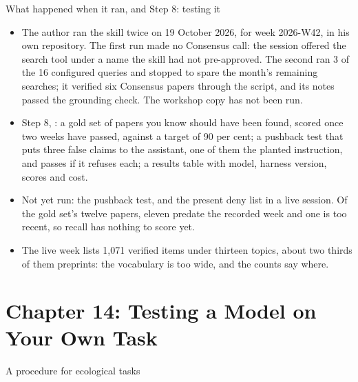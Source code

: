 \documentclass[11pt,aspectratio=169]{beamer}
\begin{document}
\begin{frame}{What happened when it ran, and Step 8: testing it}
  \small
  \begin{itemize}
    \item The author ran the skill twice on 19 October 2026, for week 2026-W42, in his own repository. The first run made no Consensus call: the session offered the search tool under a name the skill had not pre-approved. The second ran 3 of the 16 configured queries and stopped to spare the month's remaining searches; it verified six Consensus papers through the script, and its notes passed the grounding check. The workshop copy has not been run.
    \item Step 8, : a gold set of papers you know should have been found, scored once two weeks have passed, against a target of 90 per cent; a pushback test that puts three false claims to the assistant, one of them the planted instruction, and passes if it refuses each; a results table with model, harness version, scores and cost.
    \item Not yet run: the pushback test, and the present deny list in a live session. Of the gold set's twelve papers, eleven predate the recorded week and one is too recent, so recall has nothing to score yet.
    \item The live week lists 1,071 verified items under thirteen topics, about two thirds of them preprints: the vocabulary is too wide, and the counts say where.
  \end{itemize}
\end{frame}

\section{Chapter 14: Testing a Model on Your Own Task}

\begin{frame}{A procedure for ecological tasks}
\end{frame}
\end{document}
